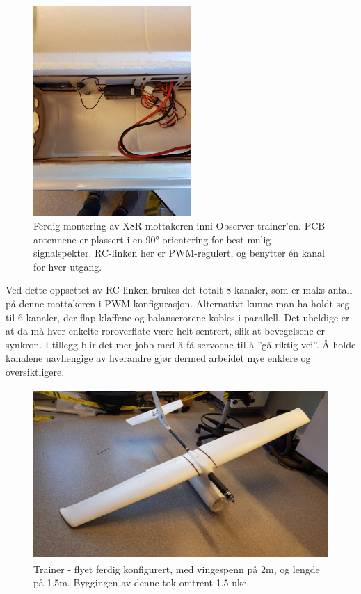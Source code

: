 \documentclass[12pt, a4paper]{article}
\begin{document}
\begin{figure}[ht]
	\centering
	\includegraphics[height=8cm, width = .6\textwidth]{bilder/mottakermontering.jpg}
	\caption[Mottaker-montering]{Ferdig montering av X8R-mottakeren inni Observer-trainer'en. PCB-antennene er plassert i en \ang{90}-orientering for best mulig signalspekter. RC-linken her er PWM-regulert, og benytter én kanal for hver utgang.}
\end{figure}
\newpage

Ved dette oppsettet av RC-linken brukes det totalt 8 kanaler, som er maks antall på denne mottakeren i PWM-konfigurasjon. Alternativt kunne man ha holdt seg til 6 kanaler, der flap-klaffene og balanserorene kobles i parallell. Det uheldige er at da må hver enkelte roroverflate være helt sentrert, slik at bevegelsene er synkron. I tillegg blir det mer jobb med å få servoene til å ''gå riktig vei''. Å holde kanalene uavhengige av hverandre gjør dermed arbeidet mye enklere og oversiktligere. 

\begin{figure}[ht]
	\centering
	\includegraphics[width=.6\textwidth, height = 6.5cm]{bilder/forste_fly_ferdigstilt.jpg}
	\caption[Trainer-fly]{Trainer - flyet ferdig konfigurert, med vingespenn på 2m, og lengde på 1.5m. Byggingen av denne tok omtrent 1.5 uke. }
\end{figure}
\end{document}
